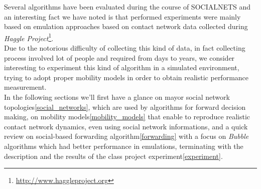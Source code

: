 Several algorithms have been evaluated during the course of SOCIALNETS and an interesting fact we have noted is that performed experiments were mainly based on emulation approaches\cite{bubble} based on contact network data collected during \emph{Haggle Project}\footnote{\url{http://www.haggleproject.org}}.\\
Due to the notorious difficulty of collecting this kind of data, in fact collecting process involved lot of people and required from days to years, we consider interesting to experiment this kind of algorithm in a simulated environment, trying to adopt proper mobility models in order to obtain realistic performance measurement.\\
In the following sections we'll first have a glance on mayor social network topologies\ref{social_networks}, which are used by algorithms for forward decision making, on mobility models\ref{mobility_models} that enable to reproduce realistic contact network dynamics, even using social network informations, and a quick review on social-based forwarding algorithm\ref{forwarding} with a focus on \emph{Bubble} algorithms\cite{bubble} which had better performance in emulations, terminating with the description and the results of the class project experiment\ref{experiment}. \\ 

